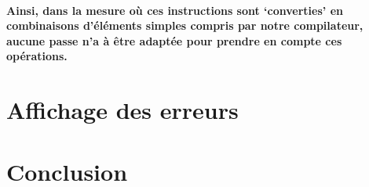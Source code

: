 \documentclass[french]{article}
\begin{document}
\paragraph{Ainsi, dans la mesure où ces instructions sont `converties' en combinaisons d'éléments simples compris par notre compilateur, aucune passe n'a
à être adaptée pour prendre en compte ces opérations.}
\section{Affichage des erreurs}

\section{Conclusion}
\end{document}
